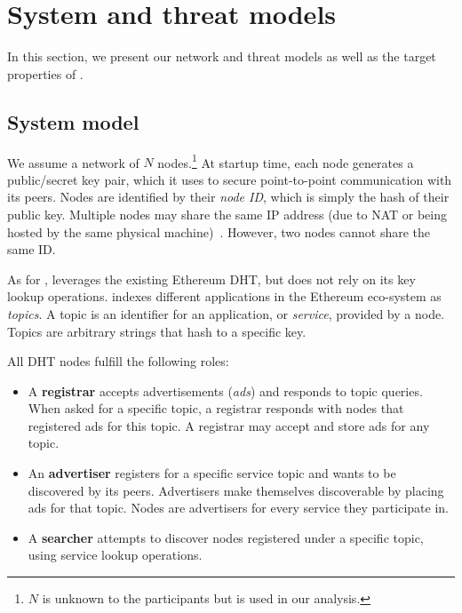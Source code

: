 
\section{System and threat models}
\label{sec:model}

In this section, we present our network and threat models as well as the target properties of \sysname. 

\subsection{System model}

We assume a network of $N$ nodes.\footnote{$N$ is unknown to the participants but is used in our analysis.}
At startup time, each node generates a public/secret key pair, which it uses to secure point-to-point communication with its peers.
Nodes are identified by their \emph{node ID}, which is simply the hash of their public key.
Multiple nodes may share the same IP address (due to NAT or being hosted by the same physical machine)~\cite{marcus2018low}.
However, two nodes cannot share the same ID.


As for \discv, \sysname leverages the existing Ethereum DHT, but does not rely on its key lookup operations.
\sysname indexes different applications in the Ethereum eco-system as \emph{topics}.
A topic is an identifier for an application, or \emph{service}, provided by a node.
Topics are arbitrary strings that hash to a specific key. %

All DHT nodes fulfill the following roles:
\begin{itemize}
    \item A \textbf{registrar} accepts advertisements (\emph{ads}) and responds to topic queries. 
    When asked for a specific topic, a registrar responds with nodes that registered ads for this topic.
    A registrar may accept and store ads for any topic.
    \item An \textbf{advertiser} registers for a specific service topic and wants to be discovered by its peers.
    Advertisers make themselves discoverable by placing ads for that topic.
    Nodes are advertisers for every service they participate in.
    \item A \textbf{searcher} attempts to discover nodes registered under a specific topic, using service lookup operations.
\end{itemize}

